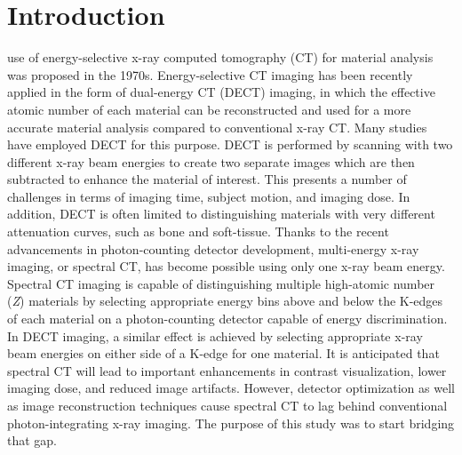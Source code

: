 \documentclass[journal, a4paper]{IEEEtran}
\begin{document}
\section{Introduction}
 use of energy-selective x-ray computed tomography (CT) for material analysis was proposed in the 1970s\cite{alvarez1976energy}. Energy-selective CT imaging has been recently applied in the form of dual-energy CT (DECT) imaging, in which the effective atomic number of each material can be reconstructed and used for a more accurate material analysis compared to conventional x-ray CT. Many studies have employed DECT for this purpose\cite{silva2011dualab,yu2012dual,johnson2007matdiffDECT}. DECT is performed by scanning with two different x-ray beam energies to create two separate images which are then subtracted to enhance the material of interest. This presents a number of challenges in terms of imaging time, subject motion, and imaging dose. In addition, DECT is often limited to distinguishing materials with very different attenuation curves, such as bone and soft-tissue\cite{fornaro2011review}. Thanks to the recent advancements in photon-counting detector development, multi-energy x-ray imaging, or spectral CT, has become possible using only one x-ray beam energy. Spectral CT imaging is capable of distinguishing multiple high-atomic number (\textit{Z}) materials by selecting appropriate energy bins above and below the K-edges of each material on a photon-counting detector capable of energy discrimination. In DECT imaging, a similar effect is achieved by selecting appropriate x-ray beam energies on either side of a K-edge for one material. It is anticipated that spectral CT will lead to important enhancements in contrast visualization, lower imaging dose, and reduced image artifacts. However, detector optimization as well as image reconstruction techniques cause spectral CT to lag behind conventional photon-integrating x-ray imaging. The purpose of this study was to start bridging that gap. 
\end{document}
